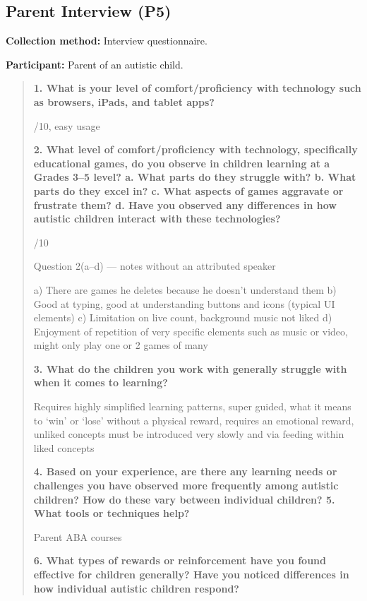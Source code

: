 \documentclass[12pt, titlepage]{article}
\begin{document}
\subsection{Parent Interview (P5)}
\label{app:participant-5}

\noindent\textbf{Collection method:} Interview questionnaire.

\noindent\textbf{Participant:} Parent of an autistic child.

\begin{quote}
\sffamily
\noindent\textbf{1. What is your level of comfort/proficiency with technology such as browsers, iPads, and tablet apps?}

/10, easy usage

\noindent\textbf{2. What level of comfort/proficiency with technology, specifically educational games, do you observe in children learning at a Grades 3–5 level? a. What parts do they struggle with? b. What parts do they excel in? c. What aspects of games aggravate or frustrate them? d. Have you observed any differences in how autistic children interact with these technologies?}

/10\par\noindent Question 2(a–d) — notes without an attributed speaker\par\noindent a) There are games he deletes because he doesn’t understand them b) Good at typing, good at understanding buttons and icons (typical UI elements) c) Limitation on live count, background music not liked d) Enjoyment of repetition of very specific elements such as music or video, might only play one or 2 games of many

\noindent\textbf{3. What do the children you work with generally struggle with when it comes to learning?}

\noindent Requires highly simplified learning patterns, super guided, what it means to ‘win’ or ‘lose’ without a physical reward, requires an emotional reward, unliked concepts must be introduced very slowly and via feeding within liked concepts

\noindent\textbf{4. Based on your experience, are there any learning needs or challenges you have observed more frequently among autistic children? How do these vary between individual children? 5. What tools or techniques help?}

\noindent Parent ABA courses

\noindent\textbf{6. What types of rewards or reinforcement have you found effective for children generally? Have you noticed differences in how individual autistic children respond?}


\end{quote}
\end{document}
